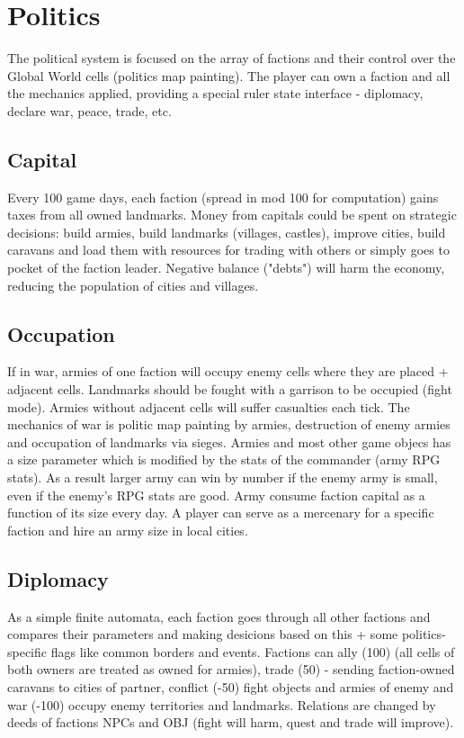 \documentclass[a4paper,12pt]{article}
\begin{document}
\newpage

\section{Politics}
\label{sec:politics}

The political system is focused on the array of factions and their control over the Global World cells (politics map painting). The player can own a faction and all the mechanics applied, providing a special ruler state interface - diplomacy, declare war, peace, trade, etc.

\subsection{Capital}

Every 100 game days, each faction (spread in mod 100 for computation) gains taxes from all owned landmarks. Money from capitals could be spent on strategic decisions: build armies, build landmarks (villages, castles), improve cities, build caravans and load them with resources for trading with others or simply goes to pocket of the faction leader. Negative balance ("debts") will harm the economy, reducing the population of cities and villages. 

\subsection{Occupation}

If in war, armies of one faction will occupy enemy cells where they are placed + adjacent cells. Landmarks should be fought with a garrison to be occupied (fight mode). Armies without adjacent cells will suffer casualties each tick. The mechanics of war is politic map painting by armies, destruction of enemy armies and occupation of landmarks via sieges. Armies and most other game objecs has a size parameter which is modified by the stats of the commander (army RPG stats). As a result larger army can win by number if the enemy army is small, even if the enemy's RPG stats are good. Army consume faction capital as a function of its size every day. A player can serve as a mercenary for a specific faction and hire an army size in local cities.

\subsection{Diplomacy}

As a simple finite automata, each faction goes through all other factions and compares their parameters and making desicions based on this + some politics-specific flags like common borders and events. Factions can ally (100) (all cells of both owners are treated as owned for armies), trade (50) - sending faction-owned caravans to cities of partner, conflict (-50) fight objects and armies of enemy and war (-100) occupy enemy territories and landmarks. Relations are changed by deeds of factions NPCs and OBJ (fight will harm, quest and trade will improve).
\end{document}
